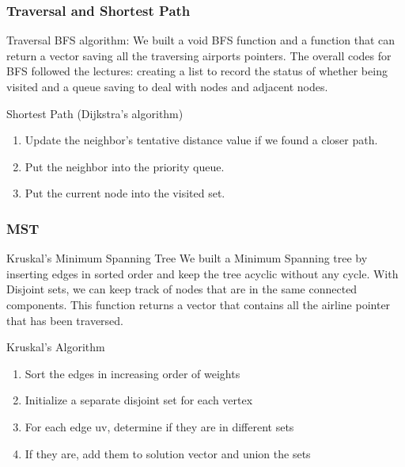 \documentclass{beamer}
\begin{document}
\begin{frame}
\frametitle{Traversal and Shortest Path}
\begin{block}{Traversal}
    BFS algorithm: \newline
    We built a void BFS function and a function that can return a vector saving all the traversing airports pointers. The overall codes for BFS followed the lectures: creating a list to record the status of whether being visited and a queue saving to deal with nodes and adjacent nodes.
\end{block}
\begin{block}{Shortest Path (Dijkstra's algorithm)}
    \begin{enumerate}
        \item Update the neighbor’s tentative distance value if we found a closer path.
        \item Put the neighbor into the priority queue. 
        \item Put the current node into the visited set.
    \end{enumerate} 
     
\end{block}
\end{frame}



\begin{frame}
\frametitle{MST}
\begin{block}{Kruskal's Minimum Spanning Tree}
    We built a Minimum Spanning tree by inserting edges in sorted order and keep the tree acyclic without any cycle. With Disjoint sets, we can keep track of nodes that are in the same connected components. This function returns a vector that contains all the airline pointer that has been traversed.
\end{block}
\begin{block}{Kruskal's Algorithm}
    \begin{enumerate}
        \item Sort the edges in increasing order of weights
        \item Initialize a separate disjoint set for each vertex
        \item For each edge uv, determine if they are in different sets
        \item If they are, add them to solution vector and union the sets
    \end{enumerate} 
\end{block}
\end{frame}
\end{document}
